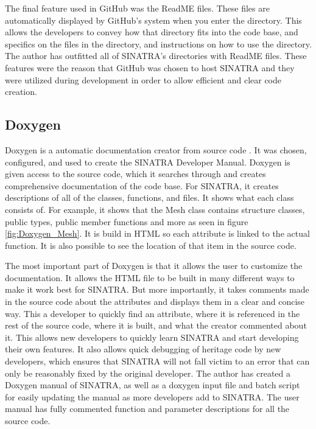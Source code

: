 \indent The final feature used in GitHub was the ReadME files. These files are automatically displayed by GitHub's system when you enter the directory. This allows the developers to convey how that directory fits into the code base, and specifics on the files in the directory, and instructions on how to use the directory. The author has outfitted all of SINATRA's directories with ReadME files. These features were the reason that GitHub was chosen to host SINATRA and they were utilized during development in order to allow efficient and clear code creation.
\subsection{Doxygen}
Doxygen is a automatic documentation creator from source code \cite{doxygen}. It was chosen, configured, and used to create the SINATRA Developer Manual. Doxygen is given access to the source code, which it searches through and creates comprehensive documentation of the code base. For SINATRA, it creates descriptions of all of the classes, functions, and files. It shows what each class consists of. For example, it shows that the Mesh class contains structure classes, public types, public member functions and more as seen in figure \ref{fig:Doxygen_Mesh}. It is build in HTML so each attribute is linked to the actual function. It is also possible to see the location of that item in the source code. \par
\indent The most important part of Doxygen is that it allows the user to customize the documentation. It allows the HTML file to be built in many different ways to make it work best for SINATRA. But more importantly, it takes comments made in the source code about the attributes and displays them in a clear and concise way. This a developer to quickly find an attribute, where it is referenced in the rest of the source code, where it is built, and what the creator commented about it. This allows new developers to quickly learn SINATRA and start developing their own features. It also allows quick debugging of heritage code by new developers, which ensures that SINATRA will not fall victim to an error that can only be reasonably fixed by the original developer. The author has created a Doxygen manual of SINATRA, as well as a doxygen input file and batch script for easily updating the manual as more developers add to SINATRA. The user manual has fully commented function and parameter descriptions for all the source code.


